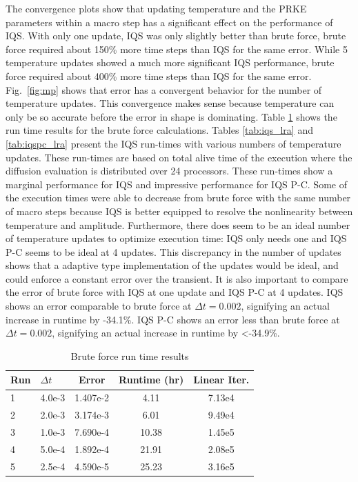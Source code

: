 \documentclass{anstrans}
\newcommand{\fig}[1]{Fig.~\ref{#1}}                      %
\begin{document}
The convergence plots show that updating temperature and the PRKE parameters within a macro step has a significant effect on the performance of IQS.  With only one update, IQS was only slightly better than brute force, brute force required about 150\% more time steps than IQS for the same error.  While 5 temperature updates showed a much more significant IQS performance, brute force required about 400\% more time steps than IQS for the same error.  \fig{fig:mp} shows that error has a convergent behavior for the number of temperature updates.  This convergence makes sense because temperature can only be so accurate before the error in shape is dominating. Table \ref{tab:ndiff_lra} shows the run time results for the brute force calculations.  Tables \ref{tab:iqs_lra} and \ref{tab:iqspc_lra} present the IQS run-times with various numbers of temperature updates.  These run-times are based on total alive time of the execution where the diffusion evaluation is distributed over 24 processors. These run-times show a marginal performance for IQS and impressive performance for IQS P-C.  Some of the execution times were able to decrease from brute force with the same number of macro steps because IQS is better equipped to resolve the nonlinearity between temperature and amplitude. Furthermore, there does seem to be an ideal number of temperature updates to optimize execution time: IQS only needs one and IQS P-C seems to be ideal at 4 updates. This discrepancy in the number of updates shows that a adaptive type implementation of the updates would be ideal, and could enforce a constant error over the transient. It is also important to compare the error of brute force with IQS at one update and IQS P-C at 4 updates.  IQS shows an error comparable to brute force at $\Delta t = 0.002$, signifying an actual increase in runtime by -34.1\%.  IQS P-C shows an error less than brute force at $\Delta t = 0.002$, signifying an actual increase in runtime by <-34.9\%. \\

\begin{table}[!htbp]
\begin{center}
\begin{tabular}{|l|l|ccc|}
\hline
Run  &  $\Delta t$ & Error & Runtime (hr) & Linear Iter.\\
\hline
1	& 4.0e-3	& 1.407e-2 	& 4.11	& 7.13e4	\\
2	& 2.0e-3	& 3.174e-3 	& 6.01	& 9.49e4 	\\
3 	& 1.0e-3 	& 7.690e-4 	& 10.38	& 1.45e5	\\
4 	& 5.0e-4 	& 1.892e-4 	& 21.91	& 2.08e5	\\
5 	& 2.5e-4	& 4.590e-5 	& 25.23	& 3.16e5	\\
\hline
\end{tabular}
\end{center}
\caption{Brute force run time results}
\label{tab:ndiff_lra}
\end{table}
\end{document}
